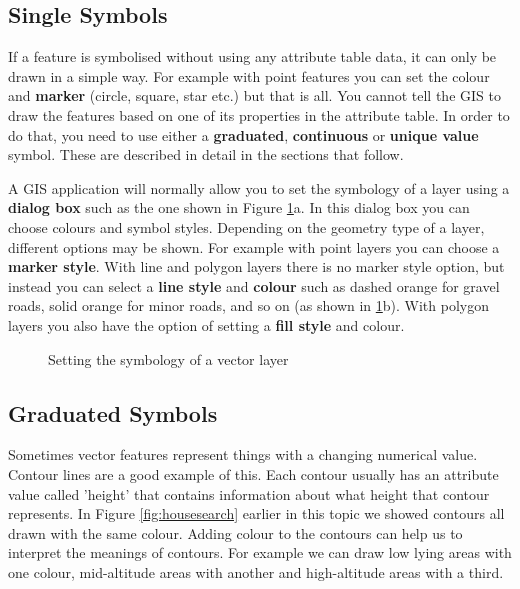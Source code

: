 \subsection{Single Symbols}

If a feature is symbolised without using any attribute table data, it can
only be drawn in a simple way. For example with point features you can set
the colour and \textbf{marker} (circle, square, star etc.) but that is all.
You cannot
tell the GIS to draw the features based on one of its properties in the
attribute table. In order to do that, you need to use either a
\textbf{graduated}, \textbf{continuous} or \textbf{unique value} symbol.
These are described in detail in the sections that follow.

A GIS application will normally allow you to set the symbology of a layer
using a \textbf{dialog box} such as the one shown in Figure
\ref{fig:symbols}a. In this
dialog box you can choose colours and symbol styles. Depending on the
geometry type of a layer, different options may be shown. For example with
point layers you can choose a \textbf{marker style}. With line and polygon layers
there is no marker style option, but instead you can select a \textbf{line
style} and \textbf{colour} such as dashed orange for gravel roads, solid
orange for minor roads,
and so on (as shown in \ref{fig:symbols}b). With polygon layers you also
have the option of setting a \textbf{fill style} and colour.

\begin{figure}[ht]
\centering
\caption{Setting the symbology of a vector layer}\label{fig:symbols}
   \goodgap
   \goodgap
\end{figure}

\subsection{Graduated Symbols}

Sometimes vector features represent things with a changing numerical value.
Contour lines are a good example of this. Each contour usually has an
attribute value called 'height' that contains information about what height
that contour represents. In Figure \ref{fig:housesearch} earlier in this
topic we showed
contours all drawn with the same colour. Adding colour to the contours can
help us to interpret the meanings of contours. For example we can draw low
lying areas with one colour, mid-altitude areas with another and
high-altitude areas with a third.

